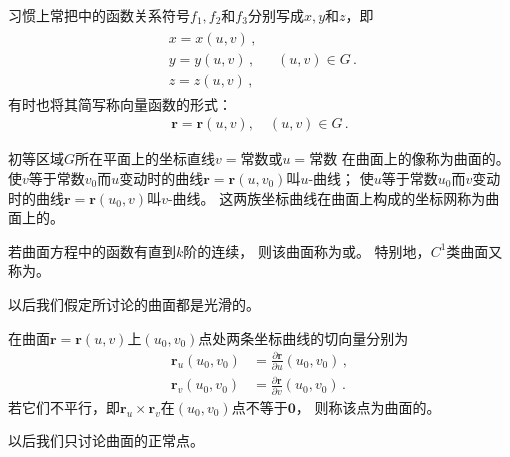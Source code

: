 习惯上常把中的函数关系符号$f_1,f_2$和$f_3$分别写成$x,y$和$z$，即
\begin{align}\label{eq:03ex01.10}
    \begin{array}{l}
        x=x(u,v)\, , \\
        y=y(u,v)\, , \\
        z=z(u,v)\, ,
    \end{array}\quad (u,v)\in G\, .
\end{align}
有时也将其简写称向量函数的形式：
\begin{align}\label{eq:03ex01.11}
    \bm r=\bm r(u,v),\quad (u,v)\in G\, .
\end{align}

\begin{definition}
    初等区域$G$所在平面上的坐标直线$v=$常数或$u=$常数
    在曲面上的像称为曲面的。
    使$v$等于常数$v_0$而$u$变动时的曲线$\bm r=\bm r(u,v_0)$叫$u$-曲线；
    使$u$等于常数$u_0$而$v$变动时的曲线$\bm r=\bm r(u_0,v)$叫$v$-曲线。
    这两族坐标曲线在曲面上构成的坐标网称为曲面上的。
\end{definition}

\begin{definition}
    若曲面方程中的函数有直到$k$阶的连续，
    则该曲面称为或。
    特别地，$C^1$类曲面又称为。
\end{definition}

以后我们假定所讨论的曲面都是光滑的。

\begin{definition}
    在曲面$\bm r=\bm r(u,v)$上$(u_0,v_0)$点处两条坐标曲线的切向量分别为
    \begin{align}\label{eq:03ex01.12}
        \bm r_u(u_0,v_0) & =\frac{\partial \bm r}{\partial u}(u_0,v_0)\, , \\
        \bm r_v(u_0,v_0) & =\frac{\partial \bm r}{\partial v}(u_0,v_0)\, .
    \end{align}
    若它们不平行，即$\bm r_u\times\bm r_v$在$(u_0,v_0)$点不等于$\bm 0$，
    则称该点为曲面的。
\end{definition}

以后我们只讨论曲面的正常点。

